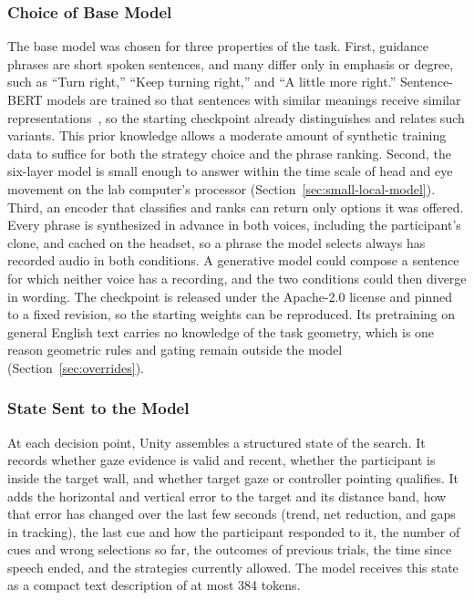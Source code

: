 \subsubsection{Choice of Base Model}
The base model was chosen for three properties of the task. First, guidance phrases are short spoken sentences, and many differ only in emphasis or degree, such as ``Turn right,'' ``Keep turning right,'' and ``A little more right.'' Sentence-BERT models are trained so that sentences with similar meanings receive similar representations~\cite{reimers2019sbert}, so the starting checkpoint already distinguishes and relates such variants. This prior knowledge allows a moderate amount of synthetic training data to suffice for both the strategy choice and the phrase ranking. Second, the six-layer model is small enough to answer within the time scale of head and eye movement on the lab computer's processor (Section~\ref{sec:small-local-model}). Third, an encoder that classifies and ranks can return only options it was offered. Every phrase is synthesized in advance in both voices, including the participant's clone, and cached on the headset, so a phrase the model selects always has recorded audio in both conditions. A generative model could compose a sentence for which neither voice has a recording, and the two conditions could then diverge in wording. The checkpoint is released under the Apache-2.0 license and pinned to a fixed revision, so the starting weights can be reproduced. Its pretraining on general English text carries no knowledge of the task geometry, which is one reason geometric rules and gating remain outside the model (Section~\ref{sec:overrides}).

\subsubsection{State Sent to the Model}
At each decision point, Unity assembles a structured state of the search. It records whether gaze evidence is valid and recent, whether the participant is inside the target wall, and whether target gaze or controller pointing qualifies. It adds the horizontal and vertical error to the target and its distance band, how that error has changed over the last few seconds (trend, net reduction, and gaps in tracking), the last cue and how the participant responded to it, the number of cues and wrong selections so far, the outcomes of previous trials, the time since speech ended, and the strategies currently allowed. The model receives this state as a compact text description of at most 384 tokens.

